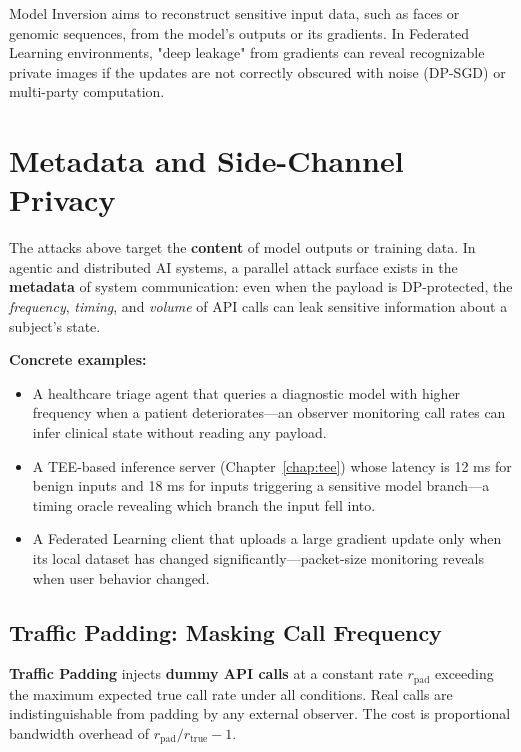 Model Inversion aims to reconstruct sensitive input data, such as faces or genomic sequences, from the model's outputs or its gradients. In Federated Learning environments, "deep leakage" from gradients \cite{zhu2019} can reveal recognizable private images if the updates are not correctly obscured with noise (DP-SGD) or multi-party computation.

\section{Metadata and Side-Channel Privacy}
\label{sec:metadata_privacy}

The attacks above target the \textbf{content} of model outputs or training data. In agentic and distributed AI systems, a parallel attack surface exists in the \textbf{metadata} of system communication: even when the payload is DP-protected, the \emph{frequency}, \emph{timing}, and \emph{volume} of API calls can leak sensitive information about a subject's state.

\textbf{Concrete examples:}
\begin{itemize}
  \item A healthcare triage agent that queries a diagnostic model with higher frequency when a patient deteriorates---an observer monitoring call rates can infer clinical state without reading any payload.
  \item A TEE-based inference server (Chapter~\ref{chap:tee}) whose latency is 12 ms for benign inputs and 18 ms for inputs triggering a sensitive model branch---a timing oracle revealing which branch the input fell into.
  \item A Federated Learning client that uploads a large gradient update only when its local dataset has changed significantly---packet-size monitoring reveals when user behavior changed.
\end{itemize}

\subsection{Traffic Padding: Masking Call Frequency}
\label{subsec:traffic_padding}

\textbf{Traffic Padding} injects \textbf{dummy API calls} at a constant rate $r_\mathrm{pad}$ exceeding the maximum expected true call rate under all conditions. Real calls are indistinguishable from padding by any external observer. The cost is proportional bandwidth overhead of $r_\mathrm{pad} / r_\mathrm{true} - 1$.

